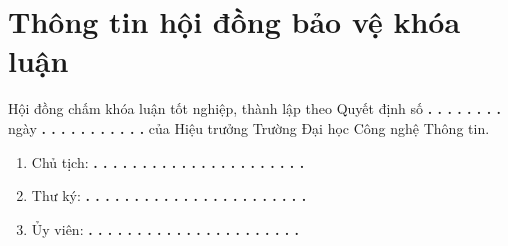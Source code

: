 \chapter*{Thông tin hội đồng bảo vệ khóa luận}

Hội đồng chấm khóa luận tốt nghiệp, thành lập theo Quyết định số \textbf{ . . . . . . . .}  ngày \textbf{ . . . . . . . . . . .} của Hiệu trưởng Trường Đại học Công nghệ Thông tin.

\begin{enumerate}
    \item Chủ tịch: \textbf{ . . . . . . . . . . . . . . . . . . . . . .}
    \item Thư ký: \textbf{ . . . . . . . . . . . . . . . . . . . . . . .}
    \item Ủy viên: \textbf{ . . . . . . . . . . . . . . . . . . . . . .}
\end{enumerate}